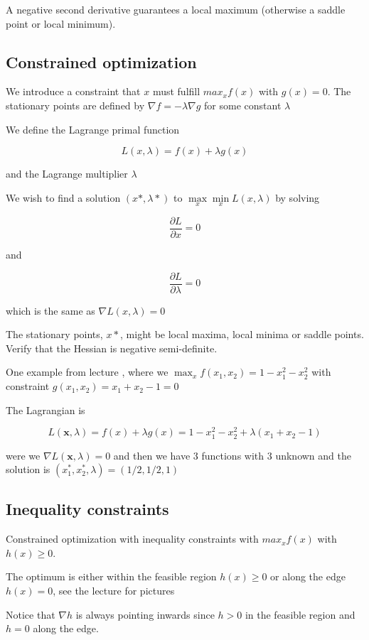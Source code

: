A negative second derivative guarantees a local maximum (otherwise a saddle point or local minimum).

\subsection{Constrained optimization}

We introduce a constraint that $x$ must fulfill $max_x f(x)$ with $g(x) = 0$. The stationary points are defined by $\nabla f = -\lambda \nabla g$ for some constant $\lambda$

We define the Lagrange primal function

\[
    L(x, \lambda) = f(x) + \lambda g(x)
\]

and the Lagrange multiplier $\lambda$

We wish to find a solution $(x*, \lambda*)$ to $\max\limits_x \min\limits_x L(x, \lambda)$ by solving

\[
    \frac{\partial L}{\partial x} = 0
\]

and

\[
    \frac{\partial L}{\partial \lambda} = 0
\]

which is the same as $\nabla L(x, \lambda) = 0$

The stationary points, $x*$, might be local maxima, local minima or saddle points. Verify that the Hessian is negative semi-definite.

One example from lecture \cite[p.~8]{lecture5}, where we $\max_x f(x_1, x_2) = 1 - x_1^2 - x_2^2$ with constraint $g(x_1, x_2) = x_1 + x_2 -1 = 0$

The Lagrangian is

\[
    L(\bm{x}, \lambda) = f(x) + \lambda g(x) = 1 - x_1^2 - x_2^2 + \lambda (x_1 + x_2 -1)
\]

were we $\nabla L(\bm{x}, \lambda) = 0$ and then we have 3 functions with 3 unknown and the solution is $(x_1^*, x_2^*, \lambda) = (1/2, 1/2, 1)$

\subsection{Inequality constraints}

Constrained optimization with inequality constraints with $max_x f(x)$ with $h(x) \geq 0$.

The optimum is either within the feasible region $h(x) \geq 0$ or along the edge $h(x) = 0$, see the lecture \cite[p.~9]{lecture5} for pictures

Notice that $\nabla h$ is always pointing inwards since $h > 0$ in the feasible region and $h=0$ along the edge.


